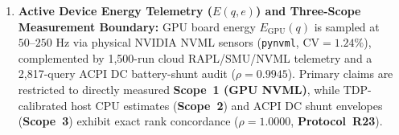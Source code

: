 \documentclass[10pt,a4paper]{article}
\begin{document}
\begin{enumerate}[leftmargin=1.5em,itemsep=3pt]
\begin{equation}
        \mathcal{M}_{\text{slot}}(q) = \frac{T_{\text{BQ\_Slot}}(q)}{T_{\text{BQ\_Wall}}(q)}, \qquad \Delta C_{\text{1M}}(q) = 10^6 \times \left( \frac{\max(\mathcal{B}_{\text{unopt}}(q), 10) - \max(\mathcal{B}_{\text{clustered}}(q), 10)}{1024^2\text{ [MiB/TiB]}} \right) \times \alpha_{\text{TB}}
    \end{equation}
    \item \textbf{Active Device Energy Telemetry ($E(q,e)$) and Three-Scope Measurement Boundary:} GPU board energy $E_{\text{GPU}}(q)$ is sampled at $50\text{--}250\text{ Hz}$ via physical NVIDIA NVML sensors (\texttt{pynvml}, $\text{CV}=1.24\%$), complemented by 1,500-run cloud RAPL/SMU/NVML telemetry and a 2,817-query ACPI DC battery-shunt audit ($\rho=0.9945$). Primary claims are restricted to directly measured \textbf{Scope~1 (GPU NVML)}, while TDP-calibrated host CPU estimates (\textbf{Scope~2}) and ACPI DC shunt envelopes (\textbf{Scope~3}) exhibit exact rank concordance ($\rho=1.0000$, \textbf{Protocol~R23}).
\end{enumerate}
\end{document}
